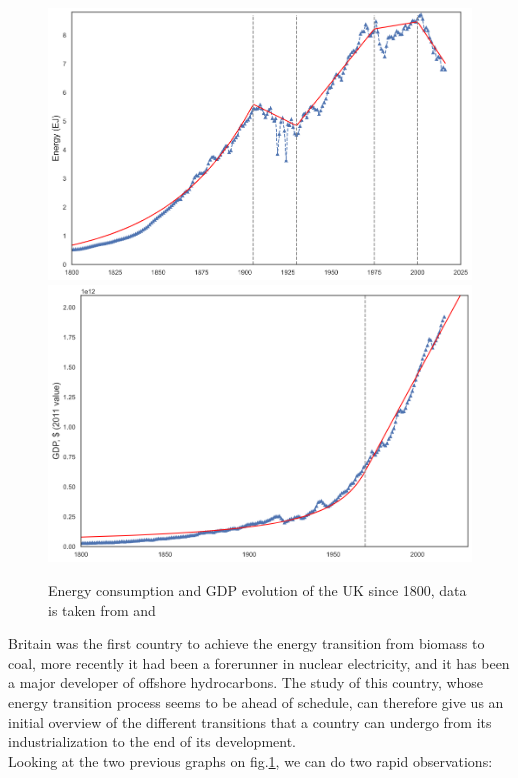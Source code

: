 \documentclass[conference]{IEEEtran}
\begin{document}
\begin{figure}
    \centering
    \includegraphics[scale=0.22]{energy-GBR.png}
    \includegraphics[scale=0.22]{gdp-gbr.png}
    \caption{Energy consumption and GDP evolution of the UK since 1800, data is taken from \cite{harvard_university_national_2021} and \cite{bolt_maddison_2020}}
    \label{GBR}
\end{figure}
Britain was the first country to achieve the energy transition from biomass to coal, more recently it had been a forerunner in nuclear electricity, and it has been a major developer of offshore hydrocarbons. The study of this country, whose energy transition process seems to be ahead of schedule, can therefore give us an initial overview of the different transitions that a country can undergo from its industrialization to the end of its development.
\\
Looking at the two previous graphs on fig.\ref{GBR}, we can do two rapid observations:
\end{document}
